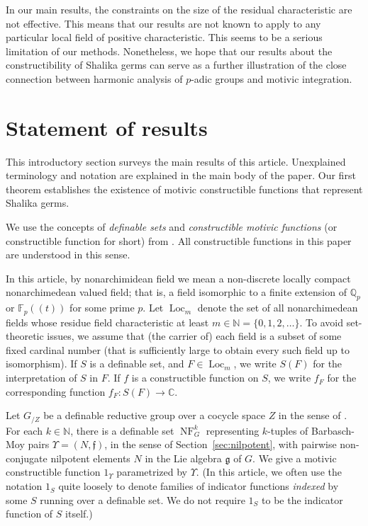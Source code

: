 \documentclass[12pt]{amsart}
\newcommand{\op}[1]{\operatorname{#1}}
\newcommand{\ring}[1]{{\mathbb #1}}
\def\NF{\op{NF}}
\def\Y{\Upsilon}
\def\s{{\mathfrak{f}}}
\newcommand{\fg}{\mathfrak{g}}
\theoremstyle{plain}
\theoremstyle{definition}
\begin{document}
In our main results, the constraints on the size of the residual
characteristic are not effective.  This means that our results are not
known to apply to any particular local field of positive
characteristic. This seems to be a serious limitation of our methods.
Nonetheless, we hope that our results about the constructibility of
Shalika germs can serve as a further illustration of the close
connection between harmonic analysis of $p$-adic groups and motivic
integration.


\section{Statement of results}


This introductory section surveys the main results of this article.
Unexplained terminology and notation are explained in the main body of
the paper.  Our first theorem establishes the existence of motivic
constructible functions that represent Shalika germs.

We use the concepts of {\it definable sets} and {\it
  constructible motivic functions} (or constructible function for
short) from \cite{CL}.  All constructible functions in this paper are
understood in this sense.  

In this article, by nonarchimidean field we mean a non-discrete
locally compact nonarchimedean valued field; that is, a field
isomorphic to a finite extension of $\ring{Q}_p$ or $\ring{F}_p((t))$
for some prime $p$.  Let $\op{Loc}_m$ denote the set of all
nonarchimedean fields whose residue field characteristic at least
$m\in \ring{N}=\{0,1,2,\ldots\}$.  To avoid set-theoretic issues, we
assume that (the carrier of) each field is a subset of some fixed
cardinal number (that is sufficiently large to obtain every such field
up to isomorphism).  If $S$ is a definable set, and $F\in \op{Loc}_m$,
we write $S(F)$ for the interpretation of $S$ in $F$.  If $f$ is a
constructible function on $S$, we write $f_F$ for the corresponding
function $f_F:S(F)\to \ring{C}$.

Let $G_{/Z}$ be a definable reductive group over a cocycle space $Z$
in the sense of \cite{CGH}.  For each $k\in\ring{N}$, there is a
definable set $\NF^k_G$ representing $k$-tuples of Barbasch-Moy pairs
$\Y=(N,\s)$, in the sense of Section~\ref{sec:nilpotent}, with
pairwise non-conjugate nilpotent elements $N$ in the Lie algebra $\fg$
of $G$.  We give a motivic constructible function $1_\Y$ parametrized
by $\Y$.  (In this article, we often use the notation $1_S$ quite
loosely to denote families of indicator functions {\it indexed} by
some $S$ running over a definable set. We do not require $1_S$ to be
the indicator function of $S$ itself.)
\end{document}

